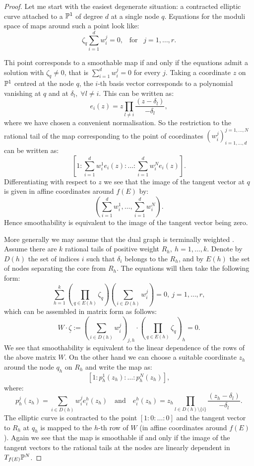 \begin{proof}
 Let me start with the easiest degenerate situation: a contracted elliptic curve attached to a $\mathbb P^1$ of degree $d$ at a single node $q$. Equations for the moduli space of maps around such a point look like: 
 \[\zeta_q\sum_{i=1}^d w_i^j=0,\;\;\;\text{for} \;\;\;j=1,\ldots,r.\]
 
 
  Thi point corresponds to a smoothable map if and only if the equations admit a solution with $\zeta_q\neq 0$, that is $\sum_{i=1}^d w_i^j=0$ for every $j$. Taking a coordinate $z$ on  $\mathbb P^1$ centred at the node $q$,   the $i$-th basis vector corresponds to a polynomial vanishing at $q$ and at $\delta_l,\;\forall l\neq i$. This can be written as:
  \[e_i(z)=z\prod_{l\neq i}\frac{(z-\delta_l)}{-\delta_l},\] 
  where we have chosen a convenient normalisation. So the restriction to the rational tail of the map corresponding to the point of coordinates $(w_i^j)_{i=1,\ldots,d}^{j=1,\ldots,N}$ can be written as:
  \[[1:\sum_{i=1}^d w_i^1e_i(z):\ldots:\sum_{i=1}^d w_i^Ne_i(z)].\] 
  Differentiating with respect to $z$ we see that the image of the tangent vector at $q$ is given in affine coordinates around $f(E)$ by:
  \[(\sum_{i=1}^d w_i^1,\ldots,\sum_{i=1}^d w_i^N).\] 
  Hence smoothability is equivalent to the image of the tangent vector being zero.
 
 More generally we may assume that the dual graph is terminally weighted \cite[\S 3.1]{HL}. Assume there are $k$  rational tails of positive weight $R_h,\ h=1,\ldots,k$. Denote by $D(h)$ the set of indices $i$ such that $\delta_i$ belongs to the $R_h$, and by $E(h)$ the set of nodes separating the core from $R_h$. The equations will then take the following form:
 \[\sum_{h=1}^k\left(\prod_{q\in E(h)}\zeta_q\right)\left(\sum_{i\in D(h)}w_i^j\right)=0,\ j=1,\ldots,r,\]
 which can be assembled in matrix form as follows:
 $$W\cdot\underline\zeta:=\left(\sum_{i\in D(h)}w_i^j\right)_{j,h}\cdot\left(\prod_{q\in E(h)}\zeta_q\right)_h=0.$$
 We see that smoothability is equivalent to the linear dependence of the rows of the above matrix $W$. On the other hand we can choose a suitable coordinate $z_h$ around the node $q_h$ on $R_h$ and write the map as: 
 \[[1:p_h^1(z_h):\ldots:p_h^N(z_h)],\]
  where: 
 \[p_h^j(z_h)=\sum_{i\in D(h)}w_i^je_i^h(z_h) \quad \text{and} \quad e_i^h(z_h)=z_h\prod_{l\in D(h)\setminus\{i\}}\frac{(z_h-\delta_l)}{-\delta_l}.\] The elliptic curve is contracted to the point $[1:0:\ldots:0]$ and the tangent vector to $R_h$ at $q_h$ is mapped to the $h$-th row of $W$ (in affine coordinates around $f(E)$). Again we see that the map is smoothable if and only if the image of the tangent vectors to the rational tails at the nodes are linearly dependent in $T_{f(E)}\mathbb P^N$.
 \end{proof}


